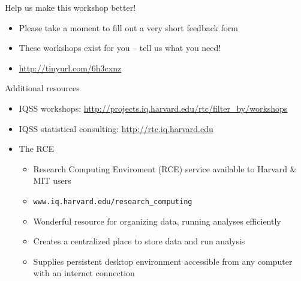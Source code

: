 \documentclass[table,smaller]{beamer}
\begin{document}
\begin{frame}[label=sec-5-1]{Help us make this workshop better!}
\begin{itemize}
\item Please take a moment to fill out a very short feedback form

\item These workshops exist for you – tell us what you need!

\item \url{http://tinyurl.com/6h3cxnz}
\end{itemize}
\end{frame}

\begin{frame}[label=sec-5-2]{Additional resources}
\begin{itemize}
\item IQSS workshops: \url{http://projects.iq.harvard.edu/rtc/filter_by/workshops}

\item IQSS statistical consulting: \url{http://rtc.iq.harvard.edu}

\item The RCE
\begin{itemize}
\item Research Computing Enviroment (RCE) service available to Harvard \& MIT users
\item \texttt{www.iq.harvard.edu/research\_computing}
\item Wonderful resource for organizing data, running analyses efficiently
\item Creates a centralized place to store data and run analysis
\item Supplies persistent desktop environment accessible from any computer with an internet connection
\end{itemize}
\end{itemize}
\end{frame}
\end{document}

